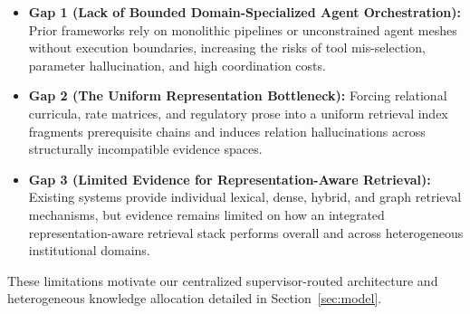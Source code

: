 \begin{itemize}
    \setlength{\itemsep}{1pt}
    \setlength{\parsep}{0pt}
    \item \textbf{Gap 1 (Lack of Bounded Domain-Specialized Agent Orchestration):} Prior frameworks rely on monolithic pipelines or unconstrained agent meshes without execution boundaries, increasing the risks of tool mis-selection, parameter hallucination, and high coordination costs.
    \item \textbf{Gap 2 (The Uniform Representation Bottleneck):} Forcing relational curricula, rate matrices, and regulatory prose into a uniform retrieval index fragments prerequisite chains and induces relation hallucinations across structurally incompatible evidence spaces.
    \item \textbf{Gap 3 (Limited Evidence for Representation-Aware Retrieval):} Existing systems provide individual lexical, dense, hybrid, and graph retrieval mechanisms, but evidence remains limited on how an integrated representation-aware retrieval stack performs overall and across heterogeneous institutional domains.
\end{itemize}

These limitations motivate our centralized supervisor-routed architecture and heterogeneous knowledge allocation detailed in Section~\ref{sec:model}.
